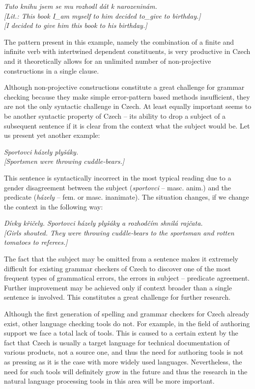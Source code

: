 \begin{multicols}{2}
\textit{Tuto knihu jsem se mu rozhodl dát k narozeninám.\\
{[}Lit.: This book I\_am myself to him decided to\_give to birthday.{]}\\
{[}I decided to give him this book to his birthday.{]}}

The pattern present in this example, namely the combination of a finite and infinite verb with intertwined dependent constituents, is very productive in Czech and it theoretically allows for an unlimited number of non-projective constructions in a single clause.

Although non-projective constructions constitute a great challenge for grammar checking because they make simple error-pattern based methods insufficient, they are not the only syntactic challenge in Czech. At least equally important seems to be another syntactic property of Czech – its ability to drop a subject of a subsequent sentence if it is clear from the context what the subject would be. Let us present yet another example:

\textit{Sportovci házely plyšáky.\\
{[}Sportsmen were throwing cuddle-bears.{]}}

This sentence is syntactically incorrect in the most typical reading due to a gender disagreement between the subject (\textit{sportovci} – masc. anim.) and the predicate (\textit{házely} – fem. or masc. inanimate). The situation changes, if we change the context in the following way:

\textit{Dívky křičely. Sportovci házely plyšáky a rozhodčím shnilá rajčata.\\
{[}Girls shouted. They were throwing cuddle-bears to the sportsman and rotten tomatoes to referees.{]}}

The fact that the subject may be omitted from a sentence makes it extremely difficult for existing grammar checkers of Czech to discover one of the most frequent types of grammatical errors, the errors in subject – predicate agreement. Further improvement may be achieved only if context broader than a single sentence is involved. This constitutes a great challenge for further research.

Although the first generation of spelling and grammar checkers for Czech already exist, other language checking tools do not. For example, in the field of authoring support we face a total lack of tools. This is caused to a certain extent by the fact that Czech is usually a target language for technical documentation of various products, not a source one, and thus the need for authoring tools is not as pressing as it is the case with more widely used languages. Nevertheless, the need for such tools will definitely grow in the future and thus the research in the natural language processing tools in this area will be more important.


\end{multicols}
